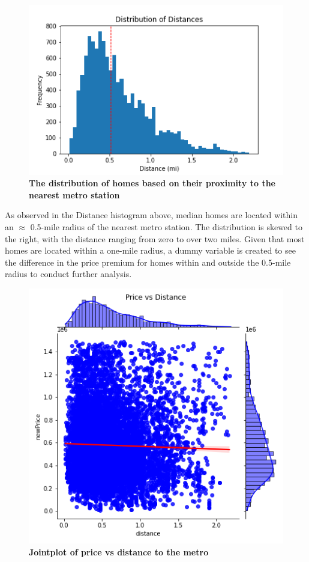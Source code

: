 \documentclass[12pt]{report}
\begin{document}
\begin{figure}[h]
\begin{center}
\caption{\textbf{The distribution of homes based on their proximity to the nearest metro station}}
\includegraphics[width=130mm]{distanceHist.png}
\end{center}
\label{fig:distanceHist}
\end{figure}
As observed in the Distance histogram above, median homes are located within an $\approx$ 0.5-mile radius of the nearest metro station. The distribution is skewed to the right, with the distance ranging from zero to over two miles. Given that most homes are located within a one-mile radius, a dummy variable is created to see the difference in the price premium for homes within and outside the 0.5-mile radius to conduct further analysis.
\clearpage

\begin{figure}[h]
\begin{center}
\includegraphics[width=130mm]{DistanceJoint.png}
\end{center}
\caption{\textbf{Jointplot of price vs distance to the metro}}
\label{fig:distanceJoint}
\end{figure}
\end{document}

